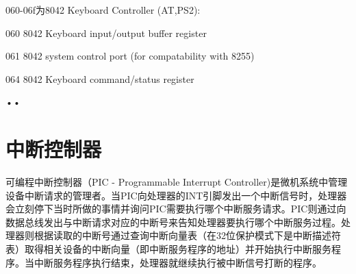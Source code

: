 \documentclass[12pt]{article}
\begin{document}
060-06f为8042 Keyboard Controller (AT,PS2):
\begin{list}{•}{•}
\item 060 8042 Keyboard input/output buffer register
\item 061 8042 system control port (for compatability with 8255)
\item 064 8042 Keyboard command/status register
\end{list}{•}{•}
\part{中断控制器}
可编程中断控制器（PIC - Programmable Interrupt Controller)是微机系统中管理设备中断请求的管理者。当PIC向处理器的INT引脚发出一个中断信号时，处理器会立刻停下当时所做的事情并询问PIC需要执行哪个中断服务请求。PIC则通过向数据总线发出与中断请求对应的中断号来告知处理器要执行哪个中断服务过程。处理器则根据读取的中断号通过查询中断向量表（在32位保护模式下是中断描述符表）取得相关设备的中断向量（即中断服务程序的地址）并开始执行中断服务程序。当中断服务程序执行结束，处理器就继续执行被中断信号打断的程序。
\end{document}
